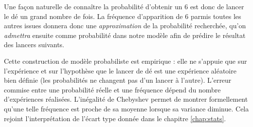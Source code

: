 Une façon naturelle de connaître la probabilité d'obtenir un $6$ est donc de lancer le dé un grand nombre de fois.
La fréquence d'apparition de $6$ parmis toutes les autres issues donnera donc une \emph{approximation} de la probabilité recherchée, qu'on \emph{admettra} ensuite comme probabilité dans notre modèle afin de prédire le résultat des lancers suivants.

Cette construction de modèle probabiliste est empirique : elle ne s'appuie que sur l'expérience et sur l'hypothèse que le lancer de dé est une expérience aléatoire bien définie (les probabilités ne changent pas d'un lancer à l'autre).
L'erreur commise entre une probabilité réelle et une fréquence dépend du nombre d'expériences réalisées.
L'inégalité de Chebyshev permet de montrer formellement qu'une telle fréquence est proche de sa moyenne lorsque sa variance diminue.
Cela rejoint l'interprétation de l'écart type donnée dans le chapitre \ref{chap:stats}.

